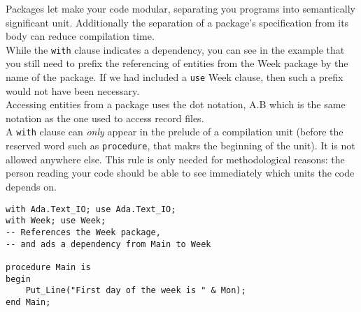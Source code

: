 \documentclass[paper=a4, fontsize=11pt]{scrartcl} %
\numberwithin{equation}{section} %
\numberwithin{figure}{section} %
\numberwithin{table}{section} %
\begin{document}
Packages let make your code modular, separating you programs into semantically significant unit. Additionally the separation of a package's specification from its body can reduce compilation time.\\

While the \verb|with| clause indicates a dependency, you can see in the example that you still need to prefix the referencing of entities from the Week package by the name of the package. If we had included a \verb|use| Week clause, then such a prefix would not have been necessary.\\

Accessing entities from a package uses the dot notation, A.B which is the same notation as the one used to access record files. \\

A \verb|with| clause can \textit{only} appear in the prelude of a compilation unit (before the reserved word such as \verb|procedure|, that makrs the beginning of the unit). It is not allowed anywhere else. This rule is only needed for methodological reasons: the person reading your code should be able to see immediately which units the code depends on. 

\begin{lstlisting}[caption = {main.adb}]
with Ada.Text_IO; use Ada.Text_IO;
with Week; use Week;
-- References the Week package,
-- and ads a dependency from Main to Week

procedure Main is 
begin  
	Put_Line("First day of the week is " & Mon);
end Main;
\end{lstlisting}
\end{document}
